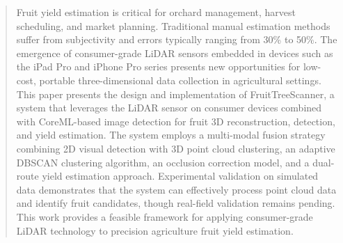 \begin{abstract}
Fruit yield estimation is critical for orchard management, harvest scheduling, and market planning. Traditional manual estimation methods suffer from subjectivity and errors typically ranging from 30\% to 50\%. The emergence of consumer-grade LiDAR sensors embedded in devices such as the iPad Pro and iPhone Pro series presents new opportunities for low-cost, portable three-dimensional data collection in agricultural settings. This paper presents the design and implementation of FruitTreeScanner, a system that leverages the LiDAR sensor on consumer devices combined with CoreML-based image detection for fruit 3D reconstruction, detection, and yield estimation. The system employs a multi-modal fusion strategy combining 2D visual detection with 3D point cloud clustering, an adaptive DBSCAN clustering algorithm, an occlusion correction model, and a dual-route yield estimation approach. Experimental validation on simulated data demonstrates that the system can effectively process point cloud data and identify fruit candidates, though real-field validation remains pending. This work provides a feasible framework for applying consumer-grade LiDAR technology to precision agriculture fruit yield estimation.
\end{abstract}